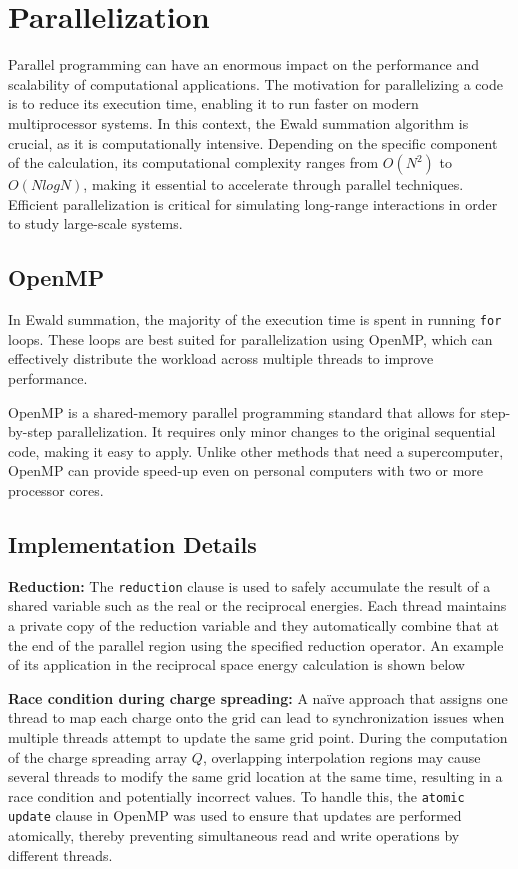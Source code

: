\section{Parallelization}
Parallel programming can have an enormous impact on the performance and scalability of computational applications. The motivation for parallelizing a code is to reduce its execution time, enabling it to run faster on modern multiprocessor systems. In this context, the Ewald summation algorithm is crucial, as it is computationally intensive. Depending on the specific component of the calculation, its computational complexity ranges from $O(N^2)$ to $O(NlogN)$, making it essential to accelerate through parallel techniques. Efficient parallelization is critical for simulating long-range interactions in order to study large-scale systems.

\subsection{OpenMP}
In Ewald summation, the majority of the execution time is spent in running \texttt{for} loops. These loops are best suited for parallelization using OpenMP, which can effectively distribute the workload across multiple threads to improve performance.

OpenMP is a shared-memory parallel programming standard that allows for step-by-step parallelization. It requires only minor changes to the original sequential code, making it easy to apply. Unlike other methods that need a supercomputer, OpenMP can provide speed-up even on personal computers with two or more processor cores.

\subsection{Implementation Details}
\textbf{Reduction:} The \verb|reduction| clause is used to safely accumulate the result of a shared variable such as the real or the reciprocal energies. Each thread maintains a private copy of the reduction variable and they automatically combine that at the end of the parallel region using the specified reduction operator. An example of its application in the reciprocal space energy calculation is shown below


\textbf{Race condition during charge spreading:} A naïve approach that assigns one thread to map each charge onto the grid can lead to synchronization issues when multiple threads attempt to update the same grid point. During the computation of the charge spreading array $Q$, overlapping interpolation regions may cause several threads to modify the same grid location at the same time, resulting in a race condition and potentially incorrect values. To handle this, the \verb|atomic update| clause in OpenMP was used to ensure that updates are performed atomically, thereby preventing simultaneous read and write operations by different threads.


